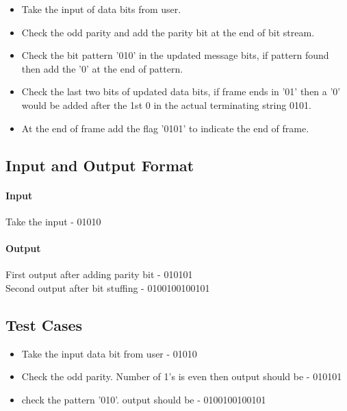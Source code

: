 \documentclass[a4paper,10pt]{report}
\begin{document}
\begin{itemize}
 \item Take the input of data bits from user.
 \item Check the odd parity and add the parity bit at the end of bit stream.
 \item Check the bit pattern '010' in the updated message bits, if pattern found then add the '0' at the end of pattern.
 \item Check the last two bits of updated data bits, if frame ends in '01' then a '0' would be added after the 1st 0 in the actual terminating string 0101.
 \item At the end of frame add the flag '0101' to indicate the end of frame.
\end{itemize}


%

\subsection{Input and Output Format}

\paragraph{Input}

Take the input - 01010

\paragraph{Output}

First output after adding parity bit - 010101\\
Second output after bit stuffing - 0100100100101


\subsection{Test Cases}

\begin{itemize}
 \item Take the input data bit from user - 01010
 \item Check the odd parity. Number of 1's is even then output should be - 010101
 \item check the pattern '010'. output should be - 0100100100101
\end{itemize}
\end{document}
